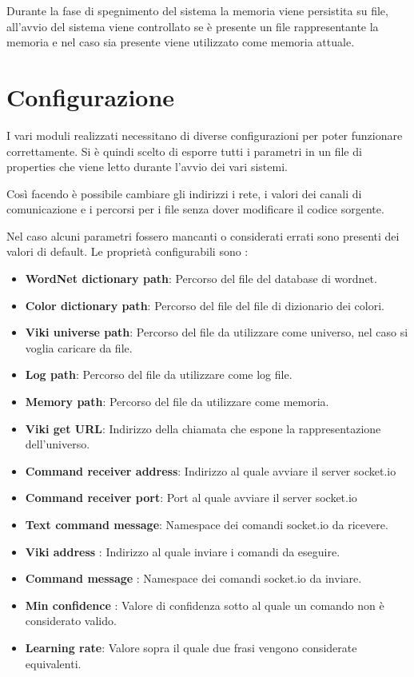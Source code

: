 \documentclass[twoside]{supsistudent}
\begin{document}
Durante la fase di spegnimento del sistema la memoria viene persistita su file, all'avvio del sistema viene controllato se è presente un file rappresentante la memoria e nel caso sia presente viene utilizzato come memoria attuale.

\chapter{Configurazione}
I vari moduli realizzati necessitano di diverse configurazioni per poter funzionare correttamente. Si è quindi scelto di esporre tutti i parametri in un file di properties che viene letto durante l'avvio dei vari sistemi. 

Così facendo è possibile cambiare gli indirizzi i rete, i valori dei canali di comunicazione e i percorsi per i file senza dover modificare il codice sorgente.

Nel caso alcuni parametri fossero mancanti o considerati errati sono presenti dei valori di default.
Le proprietà configurabili sono :
\begin{itemize}

  \item \textbf{WordNet dictionary path}: Percorso del file del database di wordnet.
   \item \textbf{Color dictionary path}: Percorso del file del file di dizionario dei colori.
      \item \textbf{Viki universe path}: Percorso del file da utilizzare come universo, nel caso si voglia caricare da file.
      \item \textbf{Log path}: Percorso del file da utilizzare come log file.
      \item \textbf{Memory path}: Percorso del file da utilizzare come memoria.
      \item \textbf{Viki get URL}: Indirizzo della chiamata che espone la rappresentazione dell'universo.
      \item \textbf{Command receiver address}: Indirizzo al quale avviare il server socket.io
      \item \textbf{Command receiver port}: Port al quale avviare il server socket.io
      \item \textbf{Text command message}: Namespace dei comandi socket.io da ricevere.
      \item \textbf{Viki address }: Indirizzo al quale inviare i comandi da eseguire.
      \item \textbf{Command message }: Namespace dei comandi socket.io da inviare.
      \item \textbf{Min confidence }: Valore di confidenza sotto al quale un comando non è considerato valido.
      \item \textbf{Learning rate}: Valore sopra il quale due frasi vengono considerate equivalenti.
\end{itemize}
\end{document}
